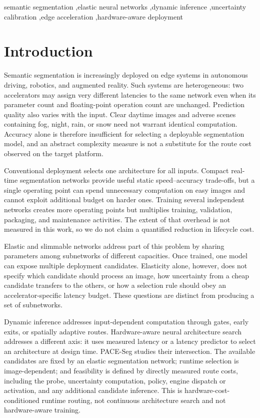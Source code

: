 \documentclass[a4paper,review,12pt]{elsarticle}
\newcommand{\method}{PACE-Seg}
\begin{document}
\begin{frontmatter}
\begin{keyword}
semantic segmentation \sep elastic neural networks \sep dynamic inference \sep uncertainty calibration \sep edge acceleration \sep hardware-aware deployment
\end{keyword}

\end{frontmatter}

\section{Introduction}
\label{sec:introduction}

Semantic segmentation is increasingly deployed on edge systems in autonomous driving, robotics, and augmented reality. Such systems are heterogeneous: two accelerators may assign very different latencies to the same network even when its parameter count and floating-point operation count are unchanged. Prediction quality also varies with the input. Clear daytime images and adverse scenes containing fog, night, rain, or snow need not warrant identical computation. Accuracy alone is therefore insufficient for selecting a deployable segmentation model, and an abstract complexity measure is not a substitute for the route cost observed on the target platform.

Conventional deployment selects one architecture for all inputs. Compact real-time segmentation networks provide useful static speed--accuracy trade-offs, but a single operating point can spend unnecessary computation on easy images and cannot exploit additional budget on harder ones. Training several independent networks creates more operating points but multiplies training, validation, packaging, and maintenance activities. The extent of that overhead is not measured in this work, so we do not claim a quantified reduction in lifecycle cost.

Elastic and slimmable networks address part of this problem by sharing parameters among subnetworks of different capacities. Once trained, one model can expose multiple deployment candidates. Elasticity alone, however, does not specify which candidate should process an image, how uncertainty from a cheap candidate transfers to the others, or how a selection rule should obey an accelerator-specific latency budget. These questions are distinct from producing a set of subnetworks.

Dynamic inference addresses input-dependent computation through gates, early exits, or spatially adaptive routes. Hardware-aware neural architecture search addresses a different axis: it uses measured latency or a latency predictor to select an architecture at design time. \method{} studies their intersection. The available candidates are fixed by an elastic segmentation network; runtime selection is image-dependent; and feasibility is defined by directly measured route costs, including the probe, uncertainty computation, policy, engine dispatch or activation, and any additional candidate inference. This is hardware-cost-conditioned runtime routing, not continuous architecture search and not hardware-aware training.
\end{document}
